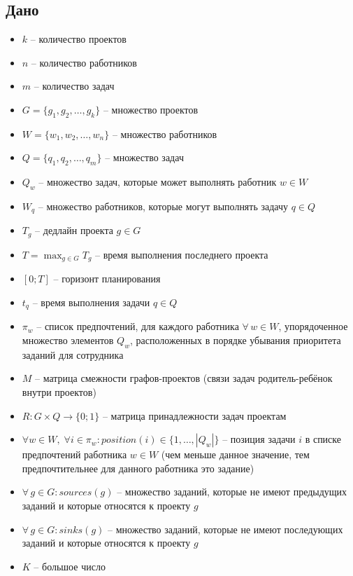 \documentclass[14pt,fleqn]{extarticle}
\begin{document}
	\subsection*{Дано}
	\renewcommand\labelitemi{$\vcenter{\hbox{\tiny$\bullet$}}$}
	\begin{itemize}[topsep=0pt,itemsep=-1ex,partopsep=1ex,parsep=1ex]
		\item $k$ -- количество проектов
		\item $n$ -- количество работников
		\item $m$ -- количество задач
		\item $G = \{g_1, g_2, \dots, g_k\}$ -- множество проектов
		\item $W = \{w_1, w_2, \dots, w_n\}$ -- множество работников
		\item $Q = \{q_1, q_2, \dots, q_m\}$ -- множество задач
		\item $Q_w$ -- множество задач, которые может выполнять работник $w \in W$
		\item $W_q$ -- множество работников, которые могут выполнять задачу $q \in Q$
		\item $T_g$ -- дедлайн проекта $g \in G$
		\item $T = \max_{g \in G} T_g$ -- время выполнения последнего проекта
		\item $[0; T]$ -- горизонт планирования
		\item $t_q$ -- время выполнения задачи $q \in Q$
		\item $\pi_w$ -- список предпочтений, для каждого работника $\forall \, w \in W$, упорядоченное множество элементов $Q_w$, расположенных в порядке убывания приоритета заданий для сотрудника
		\item $M$ -- матрица смежности графов-проектов (связи задач родитель-ребёнок внутри проектов)
		\item $R: G \times Q \longrightarrow \{0; 1\}$ -- матрица принадлежности задач проектам
		\item $\forall w \in W, \; \forall i \in \pi_w: position(i) \in \{1, \dots, |Q_w|\}$ -- позиция задачи $i$ в списке предпочтений работника $w \in W$ (чем меньше данное значение, тем предпочтительнее для данного работника это задание)
		\item $\forall \, g \in G: sources(g)$ -- множество заданий, которые не имеют предыдущих заданий и которые относятся к проекту $g$
		\item $\forall \, g \in G: sinks(g)$ -- множество заданий, которые не имеют последующих заданий и которые относятся к проекту $g$
		\item $K$ -- большое число
	\end{itemize}
\end{document}
